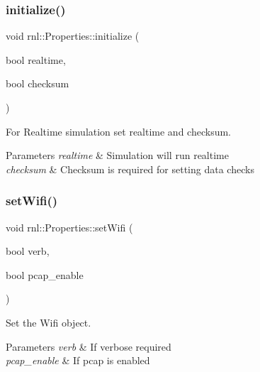 \subsubsection{\texorpdfstring{initialize()}{initialize()}}
{\footnotesize\ttfamily void rnl\+::\+Properties\+::initialize (\begin{DoxyParamCaption}\item[{bool}]{realtime,  }\item[{bool}]{checksum }\end{DoxyParamCaption})}



For Realtime simulation set realtime and checksum. 


\begin{DoxyParams}{Parameters}
{\em realtime} & Simulation will run realtime \\
\hline
{\em checksum} & Checksum is required for setting data checks \\
\hline
\end{DoxyParams}
\mbox{\label{classrnl_1_1Properties_a7d9a1bba88439c985d9ea336b73f4b03}} 
\subsubsection{\texorpdfstring{set\+Wifi()}{setWifi()}}
{\footnotesize\ttfamily void rnl\+::\+Properties\+::set\+Wifi (\begin{DoxyParamCaption}\item[{bool}]{verb,  }\item[{bool}]{pcap\+\_\+enable }\end{DoxyParamCaption})}



Set the Wifi object. 


\begin{DoxyParams}{Parameters}
{\em verb} & If verbose required \\
\hline
{\em pcap\+\_\+enable} & If pcap is enabled \\
\hline
\end{DoxyParams}
\mbox{\label{classrnl_1_1Properties_ae2a22e3a35a82d24e02e6d653bcdb330}} 
